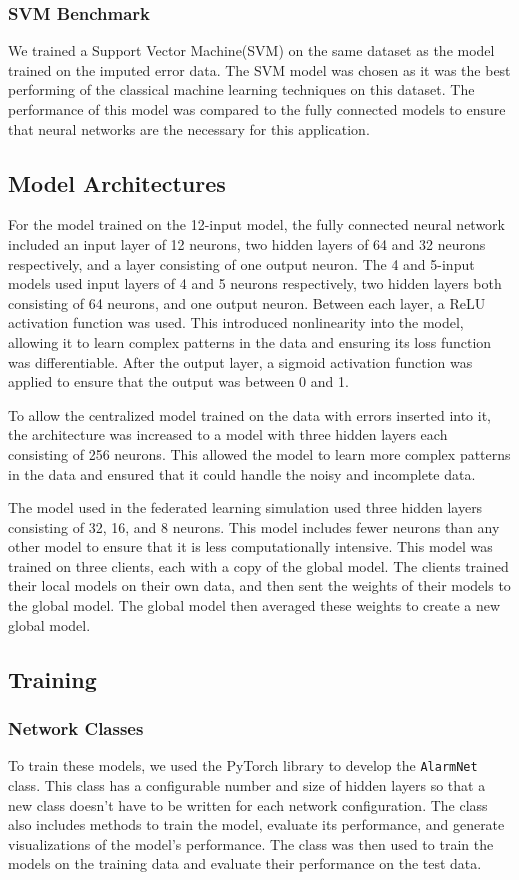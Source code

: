 \documentclass[conference]{IEEEtran}
\begin{document}
\subsubsection{SVM Benchmark}
We trained a Support Vector Machine(SVM) on the same dataset
as the model trained on the imputed error data. The SVM
model was chosen as it was the best performing of the
classical machine learning techniques on this dataset. The
performance of this model was compared to the fully
connected models to ensure that neural networks are the
necessary for this application.

\subsection{Model Architectures}
For the model trained on the 12-input model, the fully
connected neural network included an input layer of 12
neurons, two hidden layers of 64 and 32 neurons
respectively, and a layer consisting of one output neuron.
The 4 and 5-input models used input layers of 4 and 5
neurons respectively, two hidden layers both consisting of
64 neurons, and one output neuron. Between each layer, a
ReLU activation function was used. This introduced
nonlinearity into the model, allowing it to learn complex
patterns in the data and ensuring its loss function was
differentiable. After the output layer, a sigmoid activation
function was applied to ensure that the output was between 0
and 1.

To allow the centralized model trained on the data with
errors inserted into it, the architecture was increased to a
model with three hidden layers each consisting of 256
neurons. This allowed the model to learn more complex
patterns in the data and ensured that it could handle the
noisy and incomplete data.

The model used in the federated learning simulation used
three hidden layers consisting of 32, 16, and 8 neurons.
This model includes fewer neurons than any other model to
ensure that it is less computationally intensive. This model
was trained on three clients, each with a copy of the global
model. The clients trained their local models on their own
data, and then sent the weights of their models to the
global model. The global model then averaged these weights
to create a new global model.

\subsection{Training}
\subsubsection{Network Classes}
To train these models, we used the PyTorch library to
develop the \texttt{AlarmNet} class. This class has a
configurable number and size of hidden layers so that a new
class doesn't have to be written for each network
configuration. The class also includes methods to train the
model, evaluate its performance, and generate visualizations
of the model's performance. The class was then used to train
the models on the training data and evaluate their
performance on the test data.
\end{document}
